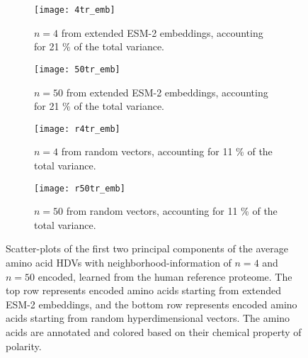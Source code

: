 \begin{figure}[H]
    \label{fig:bigfig}
    \centering
    \begin{subfigure}[b]{0.45\textwidth}
        \texttt{[image: 4tr\_emb]}
        \caption{$n = 4$ from extended ESM-2 embeddings, accounting for 21 \% of the total variance.}
        \label{fig:AAtr4}
    \end{subfigure}
    \hfill
    \begin{subfigure}[b]{0.45\textwidth}
        \texttt{[image: 50tr\_emb]}
        \caption{$n = 50$ from extended ESM-2 embeddings, accounting for 21 \% of the total variance.}
        \label{fig:AAtr50}
    \end{subfigure}
    \vspace{10pt} %
    \begin{subfigure}[b]{0.45\textwidth}
        \texttt{[image: r4tr\_emb]}
        \caption{$n = 4$ from random vectors, accounting for 11 \% of the total variance.}
        \label{fig:AArtr4}
    \end{subfigure}
    \hfill
    \begin{subfigure}[b]{0.45\textwidth}
        \texttt{[image: r50tr\_emb]}
        \caption{$n = 50$ from random vectors, accounting for 11 \% of the total variance.}
        \label{fig:AArtr50}
    \end{subfigure}
    \caption{Scatter-plots of the first two principal components of the average amino acid HDVs with neighborhood-information of $n = 4$ and $n = 50$ encoded, learned from the human reference proteome. The top row represents encoded amino acids starting from extended ESM-2 embeddings, and the bottom row represents encoded amino acids starting from random hyperdimensional vectors. The amino acids are annotated and colored based on their chemical property of polarity.}
\end{figure}

